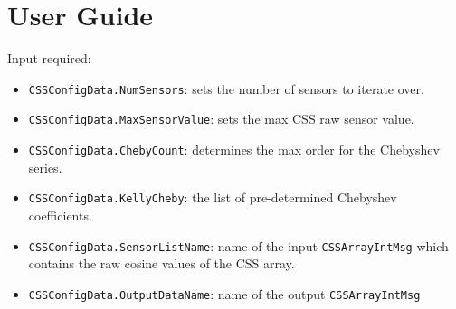 
\section{User Guide}
Input required: 
\begin{itemize}

\item \verb~CSSConfigData.NumSensors~: sets the number of sensors to iterate over.
\item  \verb~CSSConfigData.MaxSensorValue~: sets the max CSS raw sensor value.
\item \verb~CSSConfigData.ChebyCount~: determines the max order for the Chebyshev series.
\item  \verb~CSSConfigData.KellyCheby~: the list of pre-determined Chebyshev coefficients.
\item  \verb~CSSConfigData.SensorListName~: name of the input \verb~CSSArrayIntMsg~ which contains the raw cosine values of the CSS array.
\item  \verb~CSSConfigData.OutputDataName~: name of the output \verb~CSSArrayIntMsg~

\end{itemize}
